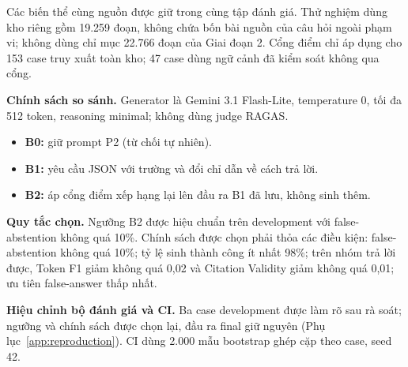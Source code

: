 Các biến thể cùng nguồn được giữ trong cùng tập đánh giá. Thử nghiệm dùng kho riêng gồm 19.259 đoạn, không chứa bốn bài nguồn của câu hỏi ngoài phạm vi; không dùng chỉ mục 22.766 đoạn của Giai đoạn 2. Cổng điểm chỉ áp dụng cho 153 case truy xuất toàn kho; 47 case dùng ngữ cảnh đã kiểm soát không qua cổng.

\textbf{Chính sách so sánh.} Generator là Gemini 3.1 Flash-Lite, temperature 0, tối đa 512 token, reasoning minimal; không dùng judge RAGAS.
\begin{itemize}
\item \textbf{B0:} giữ prompt P2 (từ chối tự nhiên).
\item \textbf{B1:} yêu cầu JSON với trường  và đổi chỉ dẫn về cách trả lời.
\item \textbf{B2:} áp cổng điểm xếp hạng lại lên đầu ra B1 đã lưu, không sinh thêm.
\end{itemize}
\textbf{Quy tắc chọn.} Ngưỡng B2 được hiệu chuẩn trên development với false-abstention không quá 10\%. Chính sách được chọn phải thỏa các điều kiện: false-abstention không quá 10\%; tỷ lệ sinh thành công ít nhất 98\%; trên nhóm trả lời được, Token F1 giảm không quá 0,02 và Citation Validity giảm không quá 0,01; ưu tiên false-answer thấp nhất.

\textbf{Hiệu chỉnh bộ đánh giá và CI.} Ba case development được làm rõ sau rà soát; ngưỡng và chính sách được chọn lại, đầu ra final giữ nguyên (Phụ lục~\ref{app:reproduction}). CI dùng 2.000 mẫu bootstrap ghép cặp theo case, seed 42.

